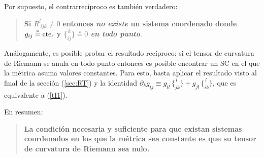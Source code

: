 Por supuesto, el contrarrecíproco es también verdadero:
\begin{tcolorbox}
\begin{quotation}
\textbf{Si $R_{\ ijk}^l\neq0$
entonces \textit{no existe} un sistema coordenado donde $g_{ij}\overset{\ast}{=}{\rm
cte.}$ y $\{ _{ i j}^{\, k}\} \overset{\ast}{=}0$ \textit{en todo punto}}.
\end{quotation}
\end{tcolorbox}

Análogamente, es posible probar el resultado recíproco: si el tensor de curvatura de Riemann se anula en todo punto entonces es posible encontrar un SC en el que la métrica asuma valores constantes. Para esto, basta aplicar el resultado visto al final de la sección (\ref{sec:RT}) y la identidad $\partial_kg_{ij}\equiv g_{il}\,\{^{\, l} _{jk}\}+g_{jl}\,\{^{\, l} _{ik}\}$, que es equivalente a (\ref{tI1}).

En resumen:
\begin{tcolorbox}
\begin{quotation}
\textbf{La condición necesaria y suficiente para que existan sistemas coordenados en los que la métrica sea constante es que su tensor de curvatura de Riemann sea nulo.}
\end{quotation}
\end{tcolorbox}
%


